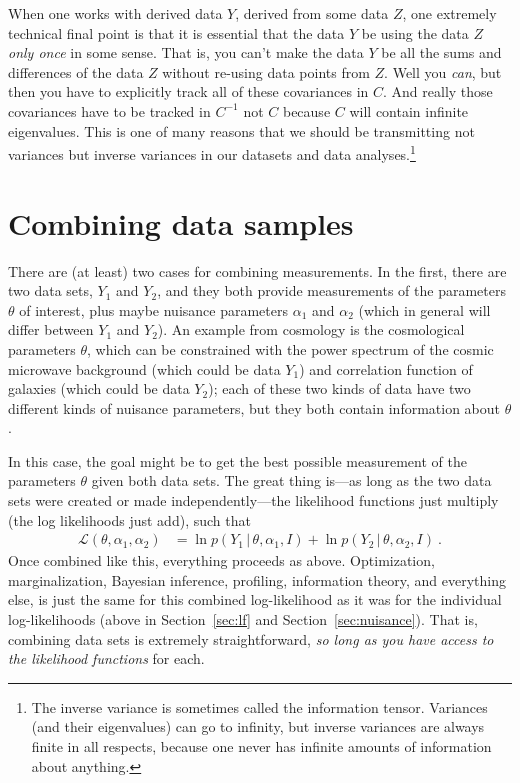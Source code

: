 \documentclass{article}
\newcommand{\sectionname}{Section}
\newcommand{\secref}[1]{\sectionname~\ref{#1}}
\newcommand{\given}{\,|\,}
\begin{document}
When one works with derived data $Y$, derived from some data $Z$, one extremely technical final point is that it is essential that the data $Y$ be using the data $Z$ \emph{only once} in some sense.
That is, you can't make the data $Y$ be all the sums and differences of the data $Z$ without re-using data points from $Z$.
Well you \emph{can}, but then you have to explicitly track all of these covariances in $C$.
And really those covariances have to be tracked in $C^{-1}$ not $C$ because $C$ will contain infinite eigenvalues.
This is one of many reasons that we should be transmitting not variances but inverse variances in our datasets and data analyses.\footnote{The inverse variance is sometimes called the information tensor. Variances (and their eigenvalues) can go to infinity, but inverse variances are always finite in all respects, because one never has infinite amounts of information about anything.}

\section{Combining data samples}\label{sec:combining}
There are (at least) two cases for combining measurements.
In the first, there are two data sets, $Y_1$ and $Y_2$, and they both provide measurements of the parameters $\theta$ of interest, plus maybe nuisance parameters $\alpha_1$ and $\alpha_2$ (which in general will differ between $Y_1$ and $Y_2$).
An example from cosmology is the cosmological parameters $\theta$, which can be constrained with the power spectrum of the cosmic microwave background (which could be data $Y_1$) and correlation function of galaxies (which could be data $Y_2$); each of these two kinds of data have two different kinds of nuisance parameters, but they both contain information about $\theta$.

In this case, the goal might be to get the best possible measurement of the parameters $\theta$ given both data sets.
The great thing is---as long as the two data sets were created or made independently---the likelihood functions just multiply (the log likelihoods just add), such that
\begin{align}
    \mathscr{L}(\theta,\alpha_1,\alpha_2) &= \ln p(Y_1\given\theta,\alpha_1,I) + \ln p(Y_2\given\theta,\alpha_2,I) ~.\label{eq:combineLFs}
\end{align}
Once combined like this, everything proceeds as above.
Optimization, marginalization, Bayesian inference, profiling, information theory, and everything else, is just the same for this combined log-likelihood as it was for the individual log-likelihoods (above in \secref{sec:lf} and \secref{sec:nuisance}).
That is, combining data sets is extremely straightforward, \emph{so long as you have access to the likelihood functions} for each.
\end{document}
